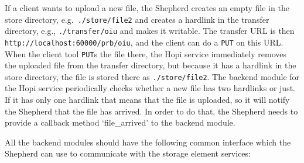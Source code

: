 \documentclass{book}
\begin{document}
If a client wants to upload a new file, the Shepherd creates an empty file in the store directory, e.g.~\verb!./store/file2! and creates a hardlink in the transfer directory, e.g., \verb!./transfer/oiu! and makes it writable. The transfer URL is then \verb!http://localhost:60000/prb/oiu!, and the client can do a \verb!PUT! on this URL. When the client tool \verb!PUT!s the file there, the Hopi service immediately removes the uploaded file from the transfer directory, but because it has a hardlink in the store directory, the file is stored there as \verb!./store/file2!. The backend module for the Hopi service periodically checks whether a new file has two hardlinks  or just. If it has only one hardlink that means that the file is uploaded, so it will notify the Shepherd that the file has arrived. In order to do that, the Shepherd needs to provide a callback method `file\_arrived' to the backend module.

All the backend modules should have the following common interface which the Shepherd can use to communicate with the storage element services:
\end{document}
